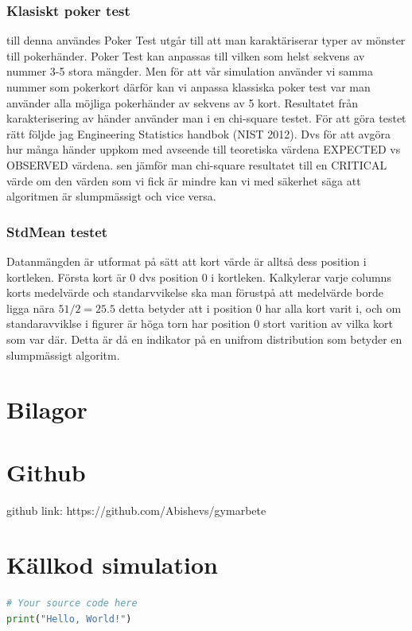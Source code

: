 \documentclass[a4paper]{article}
\renewcommand{\appendixpagename}{Bilagor}
\begin{document}
\subsubsection{Klasiskt poker test}
till denna användes \textcite{scipy}
Poker Test utgår till att man karaktäriserar typer av mönster till pokerhänder.
Poker Test kan anpassas till vilken som helst sekvens av nummer 3-5 stora
mängder. Men för att vår simulation använder vi samma nummer som pokerkort
därför kan vi anpassa klassiska poker test var man använder alla möjliga
pokerhänder av sekvens av 5 kort. Resultatet från karakterisering av händer
använder man i en chi-square testet. För att göra testet rätt följde jag
Engineering Statistics handbok (NIST 2012). Dvs för att avgöra hur många händer
uppkom med avseende till teoretiska värdena EXPECTED vs OBSERVED värdena. sen
jämför man chi-square resultatet till en CRITICAL värde om den värden som vi
fick är mindre kan vi med säkerhet säga att algoritmen är slumpmässigt och vice
versa.

\subsubsection{StdMean testet}
Datanmängden är utformat på sätt att kort värde är alltså dess position i
kortleken. Första kort är 0 dvs position 0 i kortleken. Kalkylerar varje
columns korts medelvärde och standarvvikelse ska man förustpå att medelvärde
borde ligga nära $51/2= 25.5$ detta betyder att i position 0 har alla kort varit
i, och om standaravviklse i figurer är höga torn har position 0 stort varition
av vilka kort som var där. Detta är då en indikator på en unifrom distribution
som betyder en slumpmässigt algoritm.

\printbibliography[heading=bibintoc, title={Referenser}]

\appendix
\section*{\appendixpagename} 
\addcontentsline{toc}{section}{\appendixpagename} 

\section{Github}
\label{app:github}
github link: https://github.com/Abishevs/gymarbete

\section{Källkod simulation}
\label{sec:source_code}
\begin{lstlisting}[language=Python, caption=Python example]
# Your source code here
print("Hello, World!")
\end{lstlisting}
\end{document}
